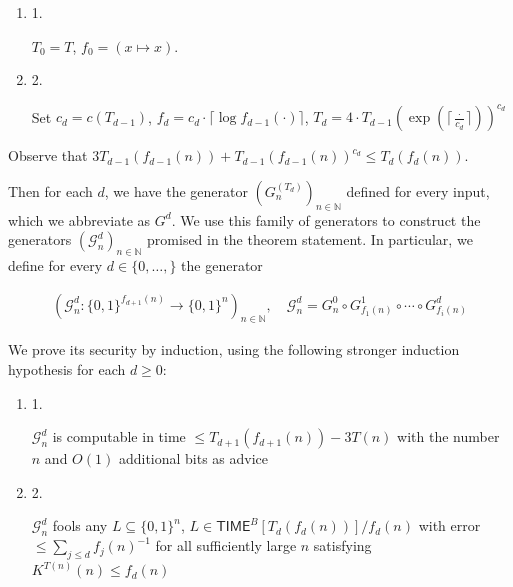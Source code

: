 \begin{enumerate}


\item[] 
1. 


$T_{0}=T$, $f_{0}=(x\mapsto x)$.\par





\item[] 
2. 


Set $c_{d}=c(T_{d-1})$, $f_{d}=c_{d}\cdot\lceil\log f_{d-1}(\cdot)\rceil$, $T_{d}=4\cdot T_{d-1}(\exp(\lceil\frac{\cdot}{c_{d}}\rceil))^{c_{d}}$\par





\end{enumerate}


Observe that $3T_{d-1}(f_{d-1}(n))+T_{d-1}(f_{d-1}(n))^{c_{d}}\leq T_{d}(f_{d}(n))$.\par




Then for each $d$, we have the generator $(G_{n}^{(T_{d})})_{n\in\mathbb{N}}$ defined for every input, which we abbreviate as $G^{d}$. We use this family of generators to construct the generators $(\mathcal{G}^{d}_{n})_{n\in\mathbb{N}}$ promised in the theorem statement.
In particular, we define for every $d\in\{0,\ldots,\}$ the generator\par


\[\begin{gathered}
(\mathcal{G}^{d}_{n}:\{0,1\}^{f_{d+1}(n)}\to\{0,1\}^{n})_{n\in\mathbb{N}},\quad\mathcal{G}^{d}_{n}=G_{n}^{0}\circ G^{1}_{f_{1}(n)}\circ\cdots\circ G^{d}_{f_{i}(n)}
\end{gathered}\]




We prove its security by induction, using the following stronger induction hypothesis for each $d\geq 0$:\par


\begin{enumerate}


\item[] 
1. 


$\mathcal{G}^{d}_{n}$ is computable in time $\leq T_{d+1}(f_{d+1}(n))-3T(n)$ with the number $n$ and $O(1)$ additional bits as advice\par





\item[] 
2. 


$\mathcal{G}^{d}_{n}$ fools any $L\subseteq\{0,1\}^{n}$, $L\in{\mathsf{TIME}}^{B}[T_{d}(f_{d}(n))]/f_{d}(n)$ with error $\leq\sum_{j\leq d}f_{j}(n)^{-1}$ for all sufficiently large $n$ satisfying $K^{T(n)}(n)\leq f_{d}(n)$\par





\end{enumerate}




